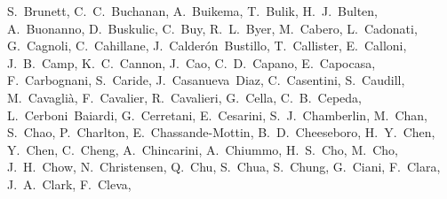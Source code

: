 {S.~Brunett,  %
C.~C.~Buchanan,  %
A.~Buikema,  %
T.~Bulik, %
H.~J.~Bulten, %
A.~Buonanno,  %
D.~Buskulic, %
C.~Buy, %
R.~L.~Byer, %
M.~Cabero,  %
L.~Cadonati,  %
G.~Cagnoli, %
C.~Cahillane,  %
J.~Calder\'on~Bustillo,  %
T.~Callister,  %
E.~Calloni, %
J.~B.~Camp,  %
K.~C.~Cannon,  %
J.~Cao,  %
C.~D.~Capano,  %
E.~Capocasa, %
F.~Carbognani, %
S.~Caride,  %
J.~Casanueva~Diaz, %
C.~Casentini, %
S.~Caudill,  %
M.~Cavagli\`a,  %
F.~Cavalier, %
R.~Cavalieri, %
G.~Cella, %
C.~B.~Cepeda,  %
L.~Cerboni~Baiardi, %
G.~Cerretani, %
E.~Cesarini, %
S.~J.~Chamberlin,  %
M.~Chan,  %
S.~Chao,  %
P.~Charlton,  %
E.~Chassande-Mottin, %
B.~D.~Cheeseboro,  %
H.~Y.~Chen,  %
Y.~Chen,  %
C.~Cheng,  %
A.~Chincarini, %
A.~Chiummo, %
H.~S.~Cho,  %
M.~Cho,  %
J.~H.~Chow,  %
N.~Christensen,  %
Q.~Chu,  %
S.~Chua, %
S.~Chung,  %
G.~Ciani,  %
F.~Clara,  %
J.~A.~Clark,  %
F.~Cleva, %
}
